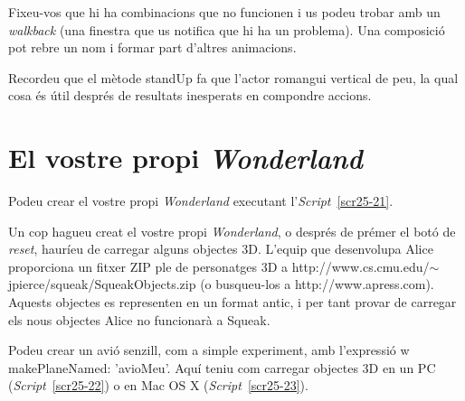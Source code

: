 Fixeu-vos que hi ha combinacions que no funcionen i us podeu trobar amb un \emph{walkback} (una finestra que us notifica que hi ha un problema). Una composició pot rebre un nom i formar part d'altres animacions.

Recordeu que el mètode \textsf{standUp} fa que l'actor romangui vertical de peu, la qual cosa és útil després de resultats inesperats en compondre accions.

\section{El vostre propi \emph{Wonderland}}
Podeu crear el vostre propi \emph{Wonderland} executant l'\emph{Script}~\ref{scr25-21}.

Un cop hagueu creat el vostre propi \emph{Wonderland}, o després de prémer el botó de \emph{reset}, hauríeu de carregar alguns objectes 3D. L'equip que desenvolupa Alice proporciona un fitxer ZIP ple de personatges 3D a \textsf{http://www.cs.cmu.edu/$\sim$jpierce/squeak/SqueakObjects.zip} (o busqueu-los a \textsf{http://www.apress.com}). Aquests objectes es representen en un format antic, i per tant provar de carregar els nous objectes Alice no funcionarà a Squeak.

Podeu crear un avió senzill, com a simple experiment, amb l'expressió \textsf{w makePlaneNamed: 'avioMeu'}. Aquí teniu com carregar objectes 3D en un PC (\emph{Script}~\ref{scr25-22}) o en Mac OS X (\emph{Script}~\ref{scr25-23}). 

